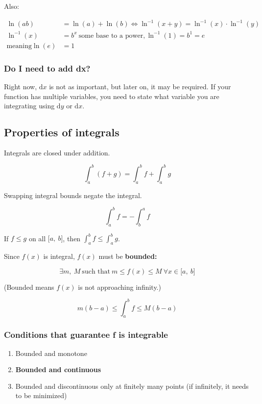 \documentclass[12pt]{article}
\theoremstyle{plain}
\theoremstyle{remark}
\theoremstyle{definition}
\begin{document}
Also:

\begin{align*}
\ln\left( ab \right) &= \ln(a) + \ln(b) \Leftrightarrow \ln^{- 1}(x + y) = \ln^{- 1}(x) \cdot \ln^{- 1}(y) \\
\ln^{- 1}(x) &= b^{x}\ \text{some\ base\ to\ a\ power},\ln^{- 1}(1) = b^{1} = e \\
\text{meaning}\ln(e) &= 1
\end{align*}




\subsubsection{Do I need to add dx?}

Right now, \(\text{d}x\) is not as important, but later on, it may be
required. If your function has multiple variables, you need to state
what variable you are integrating using \(\text{d}y\) or \(\text{d}x\).


\subsection{Properties of integrals}

Integrals are closed under addition.

\[\int_{a}^{b}(f + g) = \int_{a}^{b}f + \int_{a}^{b}g\]

Swapping integral bounds negate the integral.

\[\int_{a}^{b}f = - \int_{b}^{a}f\]

If \(f \leq g\) on all \(\lbrack a,\ b\rbrack\), then
\(\int_{a}^{b}f \leq \int_{a}^{b}g\).

Since \(f(x)\) is integral, \(f(x)\) must be \textbf{bounded:}

\[\exists m,\ M\ \text{such\ that}\ m \leq f(x) \leq M\ \forall x \in \lbrack a,\ b\rbrack\]

(Bounded means \(f(x)\) is not approaching infinity.)


\[m(b - a) \leq \int_{a}^{b}f \leq M(b - a)\]


\subsubsection{Conditions that guarantee f is
integrable}

\begin{enumerate}
\def\labelenumi{\arabic{enumi}.}
\item
  Bounded and monotone
\item
  \textbf{Bounded and continuous}
\item
  Bounded and discontinuous only at finitely many points (if infinitely,
  it needs to be minimized)
\end{enumerate}
\end{document}
